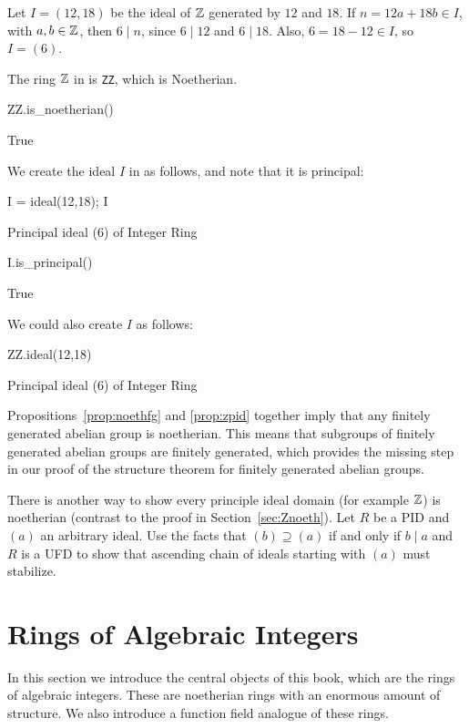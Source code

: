 \begin{example}
Let $I=(12,18)$ be the ideal of $\mathbb{Z}$ generated by $12$ and $18$.
If $n=12a+18b\in I$, with $a,b\in\mathbb{Z}$, 
then $6\mid n$, since $6\mid 12$ and $6\mid 18$.
Also, $6=18-12\in I$, so $I=(6)$.

The ring $\mathbb{Z}$
in \sage{} is {\tt ZZ}, which is Noetherian.
\begin{sagecode}
\begin{sagecell}
ZZ.is_noetherian()
\end{sagecell}
\begin{sageout}
True
\end{sageout}
We create the ideal $I$ in \sage{} as follows, and note that
it is principal:
\begin{sagecell}
I = ideal(12,18); I
\end{sagecell}
\begin{sageout}
Principal ideal (6) of Integer Ring
\end{sageout}
\begin{sagecell}
I.is_principal()
\end{sagecell}
\begin{sageout}
True
\end{sageout}
We could also create $I$ as follows:
\begin{sagecell}
ZZ.ideal(12,18)
\end{sagecell}
\begin{sageout}
Principal ideal (6) of Integer Ring
\end{sageout}
\end{sagecode}
\end{example}

Propositions~\ref{prop:noethfg} and \ref{prop:zpid} together imply that
any finitely generated abelian group is noetherian.  This means that
subgroups of finitely generated abelian groups are finitely generated,
which provides the missing step in our proof of the structure theorem
for finitely generated abelian groups.

\begin{exercise}
	There is another way to show every principle ideal domain (for example $\mathbb{Z}$) is noetherian (contrast to the proof in Section~\ref{sec:Znoeth}). Let $R$ be a PID and $(a)$ an arbitrary ideal. Use the facts that $(b)\supseteq(a)$ if and only if $b \mid a$ and $R$ is a UFD to show that ascending chain of ideals starting with $(a)$ must stabilize.
\end{exercise}

\section{Rings of Algebraic Integers}
In this section we introduce the central objects of this book, which
are the rings of algebraic integers.  These are noetherian rings with
an enormous amount of structure.  We also introduce a function field
analogue of these rings.


